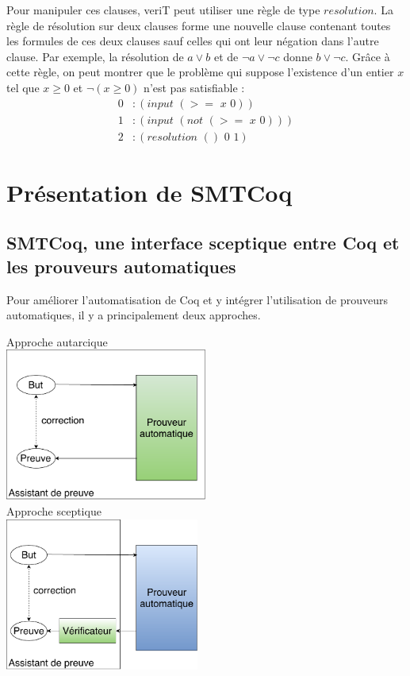 \documentclass[11pt]{article}
\begin{document}
Pour manipuler ces clauses, veriT peut utiliser une règle de type $resolution$. La règle de résolution sur deux clauses forme une nouvelle clause contenant toutes les formules de ces deux clauses sauf celles qui ont leur négation dans l'autre clause. Par exemple, la résolution de $a \vee b$ et de $\neg a \vee \neg c$ donne $b \vee \neg c$. Grâce à cette règle, on peut montrer que le problème qui suppose l'existence d'un entier $x$ tel que $x \geq 0$ et $\neg (x \geq 0)$ n'est pas satisfiable : 
\begin{align*}
0&:(input \,\, (>= \,\,x \,\,0)) \\
1&:(input \,\, (not \,\, (>= \,\,x \,\,0))) \\
2&:(resolution \,\,() \,\,0\,\, 1)
\end{align*}




\newpage 
\section{Présentation de SMTCoq}

\subsection{SMTCoq, une interface sceptique entre Coq et les prouveurs automatiques}\label{sceptique_autarcique}

Pour améliorer l'automatisation de Coq et y intégrer l'utilisation de prouveurs automatiques, il y a principalement deux approches.

\begin{multicols}{2}
\begin{center}
Approche autarcique\\
\includegraphics[height=5cm]{1_Autarcique.pdf}\\
Approche sceptique\\
\includegraphics[height=5cm]{2_Sceptique.pdf}\\

\end{center}
\end{multicols}
\end{document}
